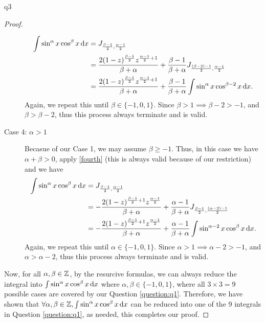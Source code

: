 \documentclass[reqno]{alittlebear}
\begin{document}
\begin{exercise}{}{}
\begin{question}{}{q3}
\begin{proof}
\begin{description}
\begin{align*}
                    \int\sin^\alpha x\cos^\beta x\mathop{}\!\mathrm{d} x &= J_{\frac{\beta-1}{2},\frac{\alpha-1}{2}}\\
                    &=\frac{2(1-z)^{\frac{\beta-1}{2}}z^{\frac{\alpha-1}{2}+1}}{\beta+\alpha}+\frac{\beta-1}{\beta+\alpha}J_{\frac{(\beta-2)-1}{2},\frac{\alpha-1}{2}}\\
                    &=\frac{2(1-z)^{\frac{\beta-1}{2}}z^{\frac{\alpha-1}{2}+1}}{\beta+\alpha}+\frac{\beta-1}{\beta+\alpha}\int\sin^\alpha x\cos^{\beta-2} x\mathop{}\!\mathrm{d} x.\\
                \end{align*}
                Again, we repeat this until $\beta\in\{-1,0,1\}$. Since $\beta>1\implies\beta-2>-1$, and $\beta>\beta-2$, thus this process always terminate and is valid.
                \item[Case 4: $\alpha>1$] Becasue of our Case 1, we may assume $\beta\geq-1$. Thus, in this case we have $\alpha+\beta>0$, apply \eqref{fourth} (this is always valid because of our restriction) and we have \begin{align*}
                    \int\sin^\alpha x\cos^\beta x\mathop{}\!\mathrm{d} x &= J_{\frac{\beta-1}{2},\frac{\alpha-1}{2}}\\
                    &=-\frac{2(1-z)^{\frac{\beta-1}{2}+1}z^{\frac{\alpha-1}{2}}}{\beta+\alpha}+\frac{\alpha-1}{\beta+\alpha}J_{\frac{\beta-1}{2},\frac{(\alpha-2)-1}{2}}\\
                    &=-\frac{2(1-z)^{\frac{\beta-1}{2}+1}z^{\frac{\alpha-1}{2}}}{\beta+\alpha}+\frac{\alpha-1}{\beta+\alpha}\int\sin^{\alpha-2} x\cos^{\beta} x\mathop{}\!\mathrm{d} x.\\
                \end{align*}
                Again, we repeat this until $\alpha\in\{-1,0,1\}$. Since $\alpha>1\implies\alpha-2>-1$, and $\alpha>\alpha-2$, thus this process always terminate and is valid.
            \end{description}

            Now, for all $\alpha,\beta\in\mathbb{Z}$, by the resurcive formulas, we can always reduce the integral into $\int \sin^\alpha x\cos^\beta x\mathop{}\!\mathrm{d} x$ where $\alpha,\beta\in\{-1,0,1\}$, where all $3\times3=9$ possible cases are covered by our Question \ref{question:q1}. Therefore, we have shown that $\forall\alpha,\beta\in\mathbb{Z}, \int \sin^\alpha x\cos^\beta x\mathop{}\!\mathrm{d} x$ can be reduced into one of the 9 integrals in Question \ref{question:q1}, as needed, this completes our proof.


\end{proof}
\end{question}
\end{exercise}
\end{document}
